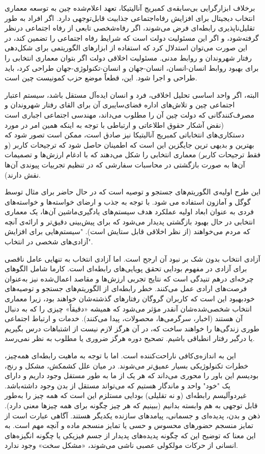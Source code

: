 برخلاف ابزارگرایی بی‌سابقه‌ی کمبریج آنالیتیکا، تعهد اعلام‌شده چین به توسعه معماری انتخاب دیجیتال برای افزایش رفاه‌اجتماعی جذابیت قابل‌توجهی دارد.
اگر افراد به طور تقلیل‌ناپذیری رابطه‌ای فرض می‌شوند، اگر رفاه‌شخصی تابعی از رفاه اجتماعی در‌نظر گرفته‌شود، و اگر این مسئولیت دولت است که شرایط رفاه اجتماعی را تضمین کند، در این صورت می‌توان استدلال کرد که استفاده از ابزارهای الگوریتمی برای شکل‌دهی رفتار شهروندان و روابط مدنی.
مسئولیت اخلاقی دولت اگر بتوان معماری انتخابی را برای بهبود روابط انسان-انسان، انسان-جهان و انسان-تکنولوژی-جهان طراحی کرد، باید طراحی و اجرا شود.
این، قطعاً موضع حزب کمونیست چین است.

البته، اگر واحد اساسی تحلیل اخلاقی، فرد و انسان ایده‌آل مستقل باشد، سیستم اعتبار اجتماعی چین و تلاش‌های اداره فضای‌سایبری آن برای القای رفتار شهروندان و مصرف‌کنندگانی که دولت چین آن را مطلوب می‌داند، مهندسی اجتماعی اجباری است (نقض آشکار حقوق اطلاعاتی و ارتباطی با توجه به اینکه همین امر در مورد دستکاری‌های انتخاباتی کمبریج آنالیتیکا نیز صادق است، ممکن است تصور شود که بهترین و بدیهی ترین جایگزین این است که اطمینان حاصل شود که ترجیحات کاربر (و فقط ترجیحات کاربر) معماری انتخابی را شکل می‌دهند که با ادغام ارزش‌ها و تصمیمات آن‌ها به صورت بازگشتی در محاسبات سفارشی که در تنظیم تجربیات پیوندی آن‌ها نقش دارند).

این طرح اولیه‌ی الگوریتم‌های جستجو و توصیه است که در حال حاضر برای مثال توسط گوگل و آمازون استفاده می شود.
با توجه به جذب و ارضای خواسته‌ها و خواسته‌های فردی به عنوان ابعاد اولیه عملکرد هدف سیستم‌های یادگیری‌ماشین آن‌ها، یک معماری انتخابی در حال بهبود بازگشتی پدیدار می‌شود که برای پیش‌بینی دقیق‌تر و ارائه‌ی آنچه که مردم می‌خواهند (از نظر اخلاقی قابل ستایش است).
"سیستم‌هایی برای افزایش آزادی‌های شخصی در انتخاب".

آزادی انتخاب بدون شک بر نبود آن ارجح است.
اما آزادی انتخاب به تنهایی عامل ناقصی برای آزادی در مفهوم بودایی تحقق پویایی‌های رابطه‌ای است.
کارما شامل الگوهای چرخه‌ای درهم تنیدگی است که نتایج تجربی ارزش‌ها و مقاصد اعمال‌شده نیز به‌عنوان فرصت‌های ارادی عمل می‌کنند.
خطر رابطه‌ای از الگوریتم‌های جستجو و توصیه‌های خودبهبود این است که کاربران گروگان رفتارهای گذشته‌شان خواهند بود، زیرا معماری انتخاب شخصی‌شده‌شان آنقدر مؤثر می‌شود که همیشه «دقیقاً» چیزی را که به دنبال آن هستند (اخبار، سرگرمی‌ها، محصولات، پیدا می‌کنند).
خدمات و ارتباط اجتماعی طوری زندگی‌ها را خواهند ساخت که، در آن هرگز لازم نیست از اشتباهات درس بگیریم یا درگیر رفتار انطباقی باشیم.
تصحیح دوره هرگز ضروری یا مطلوب به نظر نمی‌رسد.

این به اندازه‌ی‌کافی ناراحت‌کننده است.
اما با توجه به ماهیت رابطه‌ای همه‌چیز، خطرات تکنولوژیکی بسیار عمیق‌تر می‌شوند.
در میان علل کشمکش، مشکل و رنج، بودیسم این باور را محوری می‌داند که هر یک از ما به طور مستقل وجود داریم و دارای یک "خود" واحد و ماندگار هستیم که می‌تواند مستقل از بدن وجود داشته‌باشد.
غیردوآلیسم رابطه‌ای (و نه تقلیلی) بودایی مستلزم این است که همه چیز را به‌طور قابل توجهی به هم وابسته بدانیم (ببینیم که هر چیز چگونه برای همه چیزها معنی دارد).
ذهن و بدن، پدیده‌ای و جسمانی، پیامدهای سازنده یکدیگر هستند.
آگاهی عبارت است از تمایز منسجم حضورهای محسوس و حسی یا تمایز منسجم ماده و آنچه مهم است.
به این معنا که توضیح این که چگونه پدیده‌های پدیدار از جسم فیزیکی یا چگونه انگیزه‌های انسانی از حرکات مولکولی عصبی ناشی می‌شوند، «مشکل سخت» وجود ندارد.

